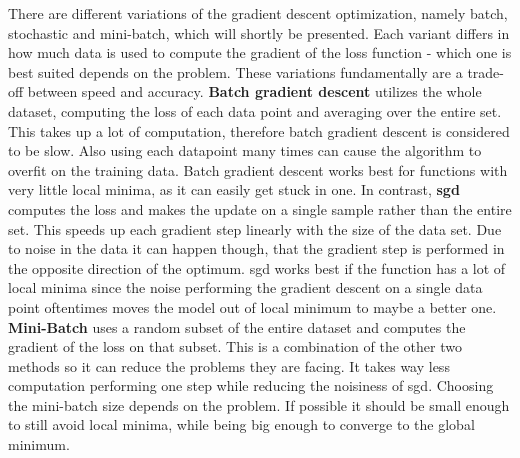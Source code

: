 There are different variations of the gradient descent optimization, namely batch, stochastic and mini-batch, which will shortly be presented. Each variant differs in how much data is used to compute the gradient of the loss function - which one is best suited depends on the problem. These variations fundamentally are a trade-off between speed and accuracy. \textbf{Batch gradient descent} utilizes the whole dataset, computing the loss of each data point and averaging over the entire set. This takes up a lot of computation, therefore batch gradient descent is considered to be slow. Also using each datapoint many times can cause the algorithm to overfit on the training data. Batch gradient descent works best for functions with very little local minima, as it can easily get stuck in one. In contrast, \textbf{\gls{sgd}} computes the loss and makes the update on a single sample rather than the entire set. This speeds up each gradient step linearly with the size of the data set. Due to noise in the data it can happen though, that the gradient step is performed in the opposite direction of the optimum. \gls{sgd} works best if the function has a lot of local minima since the noise performing the gradient descent on a single data point oftentimes moves the model out of local minimum to maybe a better one. \textbf{Mini-Batch} uses a random subset of the entire dataset and computes the gradient of the loss on that subset. This is a combination of the other two methods so it can reduce the problems they are facing. It takes way less computation performing one step while reducing the noisiness of \gls{sgd}. Choosing the mini-batch size depends on the problem. If possible it should be small enough to still avoid local minima, while being big enough to converge to the global minimum.

